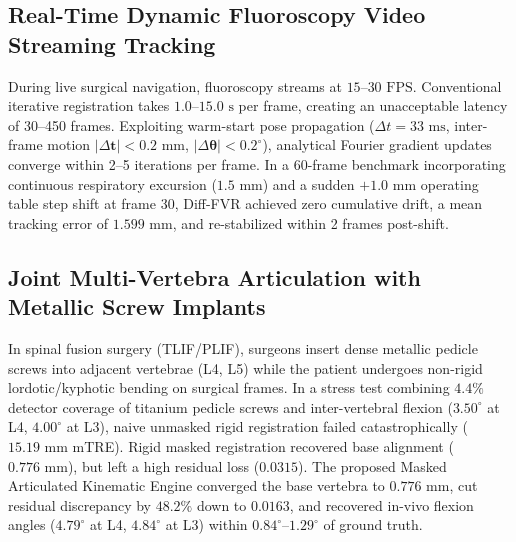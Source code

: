\documentclass[journal,twocolumn]{IEEEtran}
\begin{document}
\subsection{Real-Time Dynamic Fluoroscopy Video Streaming Tracking}
During live surgical navigation, fluoroscopy streams at $15$--$30\text{ FPS}$. Conventional iterative registration takes $1.0$--$15.0\text{ s}$ per frame, creating an unacceptable latency of 30--450 frames. Exploiting warm-start pose propagation ($\Delta t = 33\text{ ms}$, inter-frame motion $|\Delta\mathbf{t}| < 0.2\text{ mm}$, $|\Delta\boldsymbol{\theta}| < 0.2^\circ$), analytical Fourier gradient updates converge within 2--5 iterations per frame. In a 60-frame benchmark incorporating continuous respiratory excursion ($1.5\text{ mm}$) and a sudden $+1.0\text{ mm}$ operating table step shift at frame 30, Diff-FVR achieved zero cumulative drift, a mean tracking error of $1.599\text{ mm}$, and re-stabilized within 2 frames post-shift.

\subsection{Joint Multi-Vertebra Articulation with Metallic Screw Implants}
In spinal fusion surgery (TLIF/PLIF), surgeons insert dense metallic pedicle screws into adjacent vertebrae (L4, L5) while the patient undergoes non-rigid lordotic/kyphotic bending on surgical frames. In a stress test combining $4.4\%$ detector coverage of titanium pedicle screws and inter-vertebral flexion ($3.50^\circ$ at L4, $4.00^\circ$ at L3), naive unmasked rigid registration failed catastrophically ($15.19\text{ mm}$ mTRE). Rigid masked registration recovered base alignment ($0.776\text{ mm}$), but left a high residual loss ($0.0315$). The proposed Masked Articulated Kinematic Engine converged the base vertebra to $0.776\text{ mm}$, cut residual discrepancy by $48.2\%$ down to $0.0163$, and recovered in-vivo flexion angles ($4.79^\circ$ at L4, $4.84^\circ$ at L3) within $0.84^\circ$--$1.29^\circ$ of ground truth.
\end{document}
